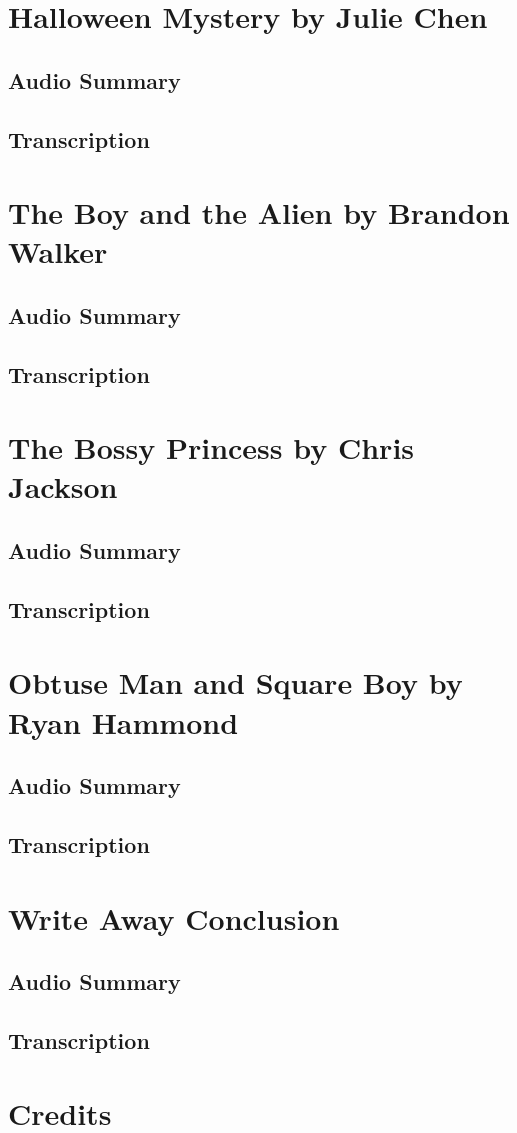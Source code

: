 \section{Halloween Mystery by Julie Chen}

\subsection{Audio Summary}

\subsection{Transcription}

\section{The Boy and the Alien by Brandon Walker}

\subsection{Audio Summary}

\subsection{Transcription}

\section{The Bossy Princess by Chris Jackson}

\subsection{Audio Summary}

\subsection{Transcription}

\section{Obtuse Man and Square Boy by Ryan Hammond}

\subsection{Audio Summary}

\subsection{Transcription}

\section{Write Away Conclusion}

\subsection{Audio Summary}

\subsection{Transcription}

\section{Credits}